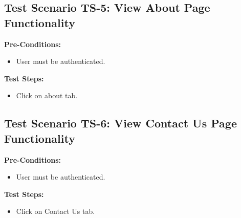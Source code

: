 \subsection{Test Scenario TS-5: View About Page Functionality}

\textbf{Pre-Conditions: }
\begin{itemize}

\item User must be authenticated.

\end{itemize}



\textbf{Test Steps:}
\begin{itemize}

\item Click on about tab.

\end{itemize}


\subsection{Test Scenario TS-6: View Contact Us Page Functionality}

\textbf{Pre-Conditions: }
\begin{itemize}

\item User must be authenticated.

\end{itemize}



\textbf{Test Steps:}
\begin{itemize}

\item Click on Contact Us tab.

\end{itemize}

